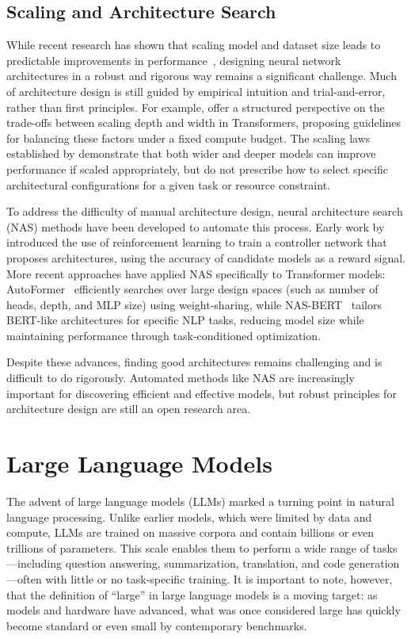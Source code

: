 \subsection{Scaling and Architecture Search}
While recent research has shown that scaling model and dataset size leads to predictable improvements in performance~\citep{kaplan2020scaling, henighan2020scaling}, designing neural network architectures in a robust and rigorous way remains a significant challenge. Much of architecture design is still guided by empirical intuition and trial-and-error, rather than first principles. For example, \citet{levine2020depth} offer a structured perspective on the trade-offs between scaling depth and width in Transformers, proposing guidelines for balancing these factors under a fixed compute budget. The scaling laws established by \citet{kaplan2020scaling} demonstrate that both wider and deeper models can improve performance if scaled appropriately, but do not prescribe how to select specific architectural configurations for a given task or resource constraint.

To address the difficulty of manual architecture design, neural architecture search (NAS) methods have been developed to automate this process. Early work by \citet{zoph2017neural} introduced the use of reinforcement learning to train a controller network that proposes architectures, using the accuracy of candidate models as a reward signal. More recent approaches have applied NAS specifically to Transformer models: AutoFormer~\citep{chen2021autoformer} efficiently searches over large design spaces (such as number of heads, depth, and MLP size) using weight-sharing, while NAS-BERT~\citep{xu2021nasbert} tailors BERT-like architectures for specific NLP tasks, reducing model size while maintaining performance through task-conditioned optimization.

Despite these advances, finding good architectures remains challenging and is difficult to do rigorously. Automated methods like NAS are increasingly important for discovering efficient and effective models, but robust principles for architecture design are still an open research area.


\section{Large Language Models}

The advent of large language models (LLMs) marked a turning point in natural language processing. Unlike earlier models, which were limited by data and compute, LLMs are trained on massive corpora and contain billions or even trillions of parameters. This scale enables them to perform a wide range of tasks—including question answering, summarization, translation, and code generation—often with little or no task-specific training. It is important to note, however, that the definition of ``large'' in large language models is a moving target: as models and hardware have advanced, what was once considered large has quickly become standard or even small by contemporary benchmarks.

